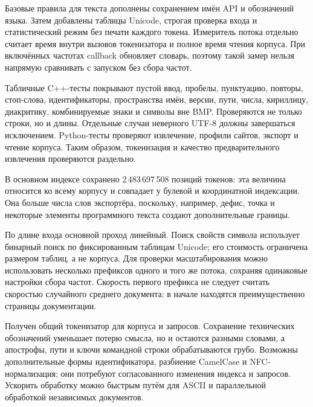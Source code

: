 \journal
Базовые правила для текста дополнены сохранением имён API и обозначений
языка. Затем добавлены таблицы Unicode, строгая проверка входа и
статистический режим без печати каждого токена. Измеритель потока отдельно
считает время внутри вызовов токенизатора и полное время чтения корпуса.
При включённых частотах callback обновляет словарь, поэтому такой замер
нельзя напрямую сравнивать с запуском без сбора частот.

\testing
Табличные C++-тесты покрывают пустой ввод, пробелы, пунктуацию, повторы,
стоп-слова, идентификаторы, пространства имён, версии, пути, числа,
кириллицу, диакритику, комбинируемые знаки и символы вне BMP.
Проверяются не только строки, но и длины. Отдельные случаи неверного
UTF-8 должны завершаться исключением. Python-тесты проверяют извлечение,
профили сайтов, экспорт и чтение корпуса. Таким образом, токенизация и
качество предварительного извлечения проверяются раздельно.

\results

В основном индексе сохранено 2\,483\,697\,508 позиций токенов:
эта величина относится ко всему корпусу и совпадает у булевой и
координатной индексации. Она больше числа слов экспортёра, поскольку,
например, дефис, точка и некоторые элементы программного текста
создают дополнительные границы.

По длине входа основной проход линейный. Поиск свойств символа использует
бинарный поиск по фиксированным таблицам Unicode; его стоимость ограничена
размером таблиц, а не корпуса. Для проверки масштабирования можно
использовать несколько префиксов одного и того же потока, сохраняя
одинаковые настройки сбора частот. Скорость первого префикса не следует
считать скоростью случайного среднего документа: в начале находятся
преимущественно страницы документации.

\conclusions
Получен общий токенизатор для корпуса и запросов. Сохранение технических
обозначений уменьшает потерю смысла, но  и
 остаются разными словами, а апострофы, пути и ключи
командной строки обрабатываются грубо. Возможны дополнительные формы
идентификатора, разбиение CamelCase и NFC-нормализация; они потребуют
согласованного изменения индекса и запросов. Ускорить обработку можно
быстрым путём для ASCII и параллельной обработкой независимых документов.
